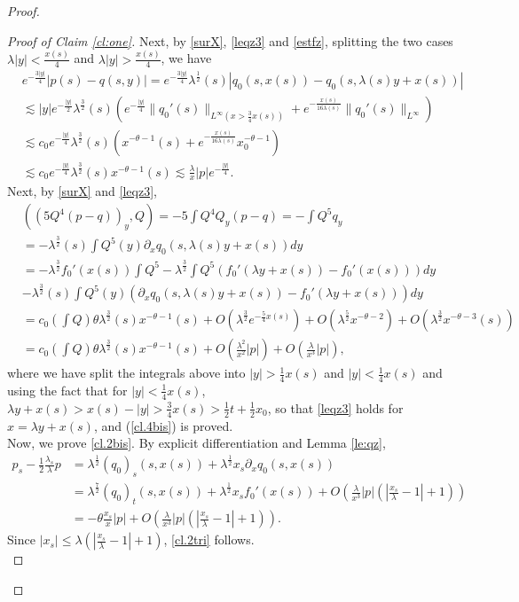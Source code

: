 \documentclass[11pt,a4paper,reqno]{amsart}
\theoremstyle{remark}
\numberwithin{equation}{section}
\def\fref#1{{\rm (\ref{#1})}}
\def\fref#1{{\rm (\ref{#1})}}
\def\lsl{\frac{\lambda_s}{\lambda}}
\def\l{\lambda}
\def\lsl{\frac{\lambda_s}{\lambda}}
\def\xsl{\frac{x_s}{\lambda}}
\begin{document}
\begin{proof}
\begin{proof}[Proof of Claim \ref{cl:one}]
Next, by \eqref{surX}, \eqref{leqz3} and \eqref{estfz},  splitting the two cases $\l |y|<\frac {x(s)}{4}$
and $\l |y| > \frac {x(s)}{4}$, we have
\begin{align}
&  e^{-\frac{3|y|}{4}} |p(s)-q(s,y)|  =
e^{-\frac{3|y|}{4}} \l^{\frac 12}(s) |q_0(s,x(s))-q_0(s,\l(s) y +x(s))| 
\nonumber\\
&\lesssim  |y| e^{-  \frac {|y|} 2 } \l^{\frac 32}(s) \left(  e^{- \frac { |y|} 4}  \|q_0'(s)\|_{L^\infty(x>\frac 34 x(s))}
+   e^{-\frac {x(s)}{16\l(s)}}\|q_0'(s)\|_{L^\infty} \right)\nonumber \\
&   \lesssim c_0 e^{-\frac {|y|} 4}  \l^{\frac 32}(s)  \left(      x^{-\theta-1}(s)
+   e^{-\frac {x(s)}{16\l(s)}} x_0^{-\theta-1} \right)\nonumber \\
&\lesssim c_0 e^{-\frac {|y|} 4}  \l^{\frac 32}(s)        x^{-\theta-1}(s)  
 \lesssim \frac {\l}{x} |p| e^{-\frac {|y|} 4}.\label{pmq}\end{align}
Next, by \eqref{surX} and \eqref{leqz3},
\begin{align*}
&\left( (5Q^4(p-q))_y ,Q\right) = -5 \int Q^4 Q_y  (p-q)= -\int Q^5 q_y 
\\
&= -\l^{\frac 32}(s) \int Q^5(y) \partial_x q_0(s,\l(s) y +x(s)) dy\\
&= - \l^{\frac 32}  f_0'( x(s)) \int Q^5  - \l^{\frac 32} \int Q^5 \left(f_0'(\l y + x(s)) -f_0'(x(s))\right)dy  \\ & -\l^{\frac 32}(s) \int Q^5(y) \left( \partial_x q_0(s,\l(s) y +x(s) )-f_0'(\l y+x(s))\right) dy\\
&
 =c_0 \left( \int Q\right) \theta   \l^{\frac 32}(s)  x^{-\theta -1}(s) 
 + O\left( \l^{\frac 32}e^{-\frac 54   x(s) } \right) + O\left( \l^{\frac 52} x^{-\theta-2}\right) 
+O\left( \l^{\frac 32} x^{-\theta-3}(s)\right)\\
&
 =c_0 \left( \int Q\right) \theta   \l^{\frac 32}(s)  x^{-\theta -1}(s) 
 + O\left(\frac {\l^2}{x^2} |p|  \right)
 + O\left(\frac {\l}{x^3} |p|  \right),
 \end{align*}
where we have split the integrals above  into $|y| >\frac 14 x(s)$ and $|y|<\frac 14 x(s)$ and using the fact that for $|y|<\frac 14 x(s)$, $\l y + x(s) >x(s)-|y|> \frac 34 x(s)   > \frac 12 t + \frac 12 x_0$, so that
 \eqref{leqz3} holds for $x= \l y + x(s)$, and \fref{cl.4bis} is proved.\\
Now, we prove \eqref{cl.2bis}. By
explicit differentiation and Lemma \ref{le:qz},
\begin{align*}
p_s - \frac 12 \lsl p & = 
\l^{\frac 12}(q_0)_s(s,x(s)) + \l^{\frac 12} x_s \partial_x q_0(s,x(s))\\
& = \l^{\frac 72} (q_0)_t(s,x(s)) + \l^{\frac 12} x_s f_0'(x(s))   
+ O\left(  \frac {\l}{x^{3}} |p| \left(\left|\xsl - 1\right|  + 1 \right) \right)\\
& = -\theta \frac {x_s} x |p| + O\left(  \frac {\l}{x^{3}} |p| \left(\left|\xsl - 1\right|  + 1 \right) \right).
\end{align*} 
Since $|x_s| \leq \l (|\xsl -1| + 1)$, \eqref{cl.2tri} follows.\\



\end{proof}
\end{proof}
\end{document}
